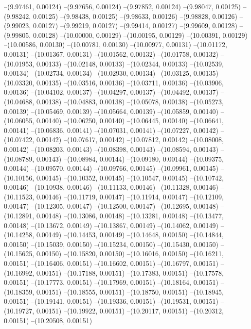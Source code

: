 --(9.97461, 0.00124)
--(9.97656, 0.00124)
--(9.97852, 0.00124)
--(9.98047, 0.00125)
--(9.98242, 0.00125)
--(9.98438, 0.00125)
--(9.98633, 0.00126)
--(9.98828, 0.00126)
--(9.99023, 0.00127)
--(9.99219, 0.00127)
--(9.99414, 0.00127)
--(9.99609, 0.00128)
--(9.99805, 0.00128)
--(10.00000, 0.00129)
--(10.00195, 0.00129)
--(10.00391, 0.00129)
--(10.00586, 0.00130)
--(10.00781, 0.00130)
--(10.00977, 0.00131)
--(10.01172, 0.00131)
--(10.01367, 0.00131)
--(10.01562, 0.00132)
--(10.01758, 0.00132)
--(10.01953, 0.00133)
--(10.02148, 0.00133)
--(10.02344, 0.00133)
--(10.02539, 0.00134)
--(10.02734, 0.00134)
--(10.02930, 0.00134)
--(10.03125, 0.00135)
--(10.03320, 0.00135)
--(10.03516, 0.00136)
--(10.03711, 0.00136)
--(10.03906, 0.00136)
--(10.04102, 0.00137)
--(10.04297, 0.00137)
--(10.04492, 0.00137)
--(10.04688, 0.00138)
--(10.04883, 0.00138)
--(10.05078, 0.00138)
--(10.05273, 0.00139)
--(10.05469, 0.00139)
--(10.05664, 0.00139)
--(10.05859, 0.00140)
--(10.06055, 0.00140)
--(10.06250, 0.00140)
--(10.06445, 0.00140)
--(10.06641, 0.00141)
--(10.06836, 0.00141)
--(10.07031, 0.00141)
--(10.07227, 0.00142)
--(10.07422, 0.00142)
--(10.07617, 0.00142)
--(10.07812, 0.00142)
--(10.08008, 0.00142)
--(10.08203, 0.00143)
--(10.08398, 0.00143)
--(10.08594, 0.00143)
--(10.08789, 0.00143)
--(10.08984, 0.00144)
--(10.09180, 0.00144)
--(10.09375, 0.00144)
--(10.09570, 0.00144)
--(10.09766, 0.00145)
--(10.09961, 0.00145)
--(10.10156, 0.00145)
--(10.10352, 0.00145)
--(10.10547, 0.00145)
--(10.10742, 0.00146)
--(10.10938, 0.00146)
--(10.11133, 0.00146)
--(10.11328, 0.00146)
--(10.11523, 0.00146)
--(10.11719, 0.00147)
--(10.11914, 0.00147)
--(10.12109, 0.00147)
--(10.12305, 0.00147)
--(10.12500, 0.00147)
--(10.12695, 0.00148)
--(10.12891, 0.00148)
--(10.13086, 0.00148)
--(10.13281, 0.00148)
--(10.13477, 0.00148)
--(10.13672, 0.00149)
--(10.13867, 0.00149)
--(10.14062, 0.00149)
--(10.14258, 0.00149)
--(10.14453, 0.00149)
--(10.14648, 0.00150)
--(10.14844, 0.00150)
--(10.15039, 0.00150)
--(10.15234, 0.00150)
--(10.15430, 0.00150)
--(10.15625, 0.00150)
--(10.15820, 0.00150)
--(10.16016, 0.00150)
--(10.16211, 0.00151)
--(10.16406, 0.00151)
--(10.16602, 0.00151)
--(10.16797, 0.00151)
--(10.16992, 0.00151)
--(10.17188, 0.00151)
--(10.17383, 0.00151)
--(10.17578, 0.00151)
--(10.17773, 0.00151)
--(10.17969, 0.00151)
--(10.18164, 0.00151)
--(10.18359, 0.00151)
--(10.18555, 0.00151)
--(10.18750, 0.00151)
--(10.18945, 0.00151)
--(10.19141, 0.00151)
--(10.19336, 0.00151)
--(10.19531, 0.00151)
--(10.19727, 0.00151)
--(10.19922, 0.00151)
--(10.20117, 0.00151)
--(10.20312, 0.00151)
--(10.20508, 0.00151)
